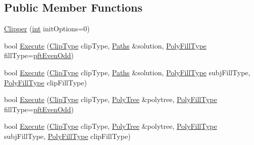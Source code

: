 \subsection*{Public Member Functions}
\begin{DoxyCompactItemize}
\item 
\mbox{\hyperlink{class_clipper_lib_1_1_clipper_adceb8536f6a80e8f115213dba9208427}{Clipper}} (\mbox{\hyperlink{draw_8hh_aa620a13339ac3a1177c86edc549fda9b}{int}} init\+Options=0)
\item 
bool \mbox{\hyperlink{class_clipper_lib_1_1_clipper_a2e4a15e6f79a5f583b42c9701b839e01}{Execute}} (\mbox{\hyperlink{namespace_clipper_lib_a3db4fddd50b81ba657107505821d7f46}{Clip\+Type}} clip\+Type, \mbox{\hyperlink{namespace_clipper_lib_a4bab1d9e10805fa6f1fd3b78c56efcfe}{Paths}} \&solution, \mbox{\hyperlink{namespace_clipper_lib_a95a41ff8fa6b351d304829c267d638d7}{Poly\+Fill\+Type}} fill\+Type=\mbox{\hyperlink{namespace_clipper_lib_a95a41ff8fa6b351d304829c267d638d7acede4475518a377720537448c7b2df73}{pft\+Even\+Odd}})
\item 
bool \mbox{\hyperlink{class_clipper_lib_1_1_clipper_a3493f37ce691ab5a408fce12007cdcb8}{Execute}} (\mbox{\hyperlink{namespace_clipper_lib_a3db4fddd50b81ba657107505821d7f46}{Clip\+Type}} clip\+Type, \mbox{\hyperlink{namespace_clipper_lib_a4bab1d9e10805fa6f1fd3b78c56efcfe}{Paths}} \&solution, \mbox{\hyperlink{namespace_clipper_lib_a95a41ff8fa6b351d304829c267d638d7}{Poly\+Fill\+Type}} subj\+Fill\+Type, \mbox{\hyperlink{namespace_clipper_lib_a95a41ff8fa6b351d304829c267d638d7}{Poly\+Fill\+Type}} clip\+Fill\+Type)
\item 
bool \mbox{\hyperlink{class_clipper_lib_1_1_clipper_aa7fc3415e002246298532b3739464d3c}{Execute}} (\mbox{\hyperlink{namespace_clipper_lib_a3db4fddd50b81ba657107505821d7f46}{Clip\+Type}} clip\+Type, \mbox{\hyperlink{class_clipper_lib_1_1_poly_tree}{Poly\+Tree}} \&polytree, \mbox{\hyperlink{namespace_clipper_lib_a95a41ff8fa6b351d304829c267d638d7}{Poly\+Fill\+Type}} fill\+Type=\mbox{\hyperlink{namespace_clipper_lib_a95a41ff8fa6b351d304829c267d638d7acede4475518a377720537448c7b2df73}{pft\+Even\+Odd}})
\item 
bool \mbox{\hyperlink{class_clipper_lib_1_1_clipper_a66e1adf49ba563b0ab21ab9cd035ee2c}{Execute}} (\mbox{\hyperlink{namespace_clipper_lib_a3db4fddd50b81ba657107505821d7f46}{Clip\+Type}} clip\+Type, \mbox{\hyperlink{class_clipper_lib_1_1_poly_tree}{Poly\+Tree}} \&polytree, \mbox{\hyperlink{namespace_clipper_lib_a95a41ff8fa6b351d304829c267d638d7}{Poly\+Fill\+Type}} subj\+Fill\+Type, \mbox{\hyperlink{namespace_clipper_lib_a95a41ff8fa6b351d304829c267d638d7}{Poly\+Fill\+Type}} clip\+Fill\+Type)

\end{DoxyCompactItemize}

